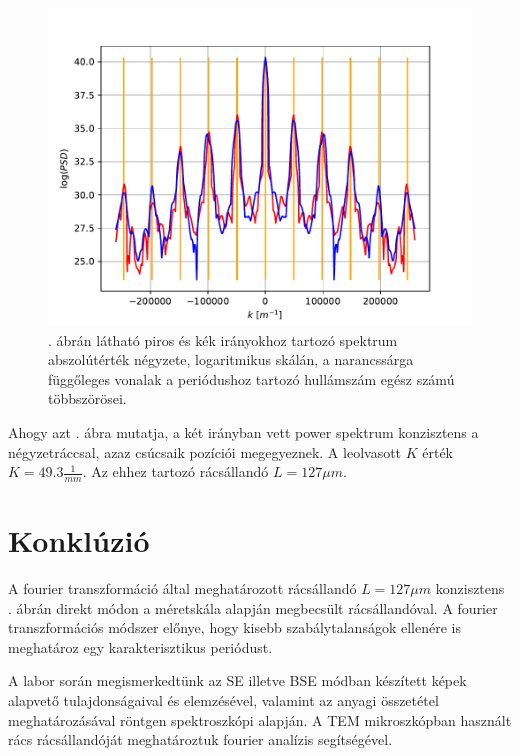 \documentclass[pdftex,12pt,a4paper]{article}
\begin{document}
		\begin{figure}[H]
			\centering
			\includegraphics[scale=1]{./figs/1dpsd.pdf}
			\caption{. ábrán látható piros és kék irányokhoz tartozó spektrum abszolútérték négyzete, logaritmikus skálán, a narancssárga függőleges vonalak a periódushoz tartozó hullámszám egész számú többszörösei.}
			\label{1dpsd}
		\end{figure}
		Ahogy azt . ábra mutatja, a két irányban vett power spektrum konzisztens a négyzetráccsal, azaz csúcsaik pozíciói megegyeznek. A leolvasott $K$ érték $K=49.3\frac{1}{mm}$. Az ehhez tartozó rácsállandó $L=127\mu m$.
	\section{Konklúzió}
		A fourier transzformáció által meghatározott rácsállandó $L=127\mu m$ konzisztens . ábrán direkt módon a méretskála alapján megbecsült rácsállandóval. A fourier transzformációs módszer előnye, hogy kisebb szabálytalanságok ellenére is meghatároz egy karakterisztikus periódust.
		
		A labor során megismerkedtünk az SE illetve BSE módban készített képek alapvető tulajdonságaival és elemzésével, valamint az anyagi összetétel meghatározásával röntgen spektroszkópi alapján. A TEM mikroszkópban használt rács rácsállandóját meghatároztuk fourier analízis segítségével.
	
    
\end{document}
